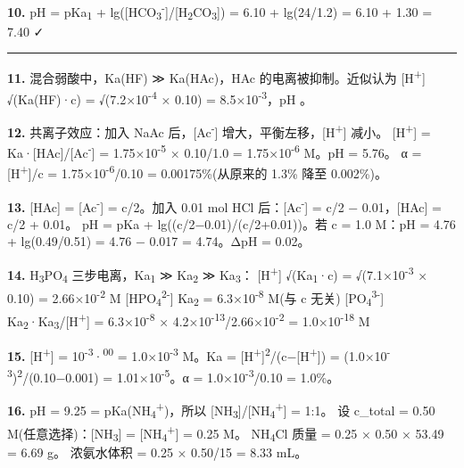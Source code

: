 \textbf{10.} pH = pKa\textsubscript{1} + lg({[}HCO\textsubscript{3}\textsuperscript{-}{]}/{[}H\textsubscript{2}CO\textsubscript{3}{]}) = 6.10 + lg(24/1.2) = 6.10 + 1.30 = 7.40 ✓

\begin{center}\rule{0.5\linewidth}{0.5pt}\end{center}

\textbf{11.} 混合弱酸中，Ka(HF) ≫ Ka(HAc)，HAc 的电离被抑制。近似认为 {[}H\textsuperscript{+}{]}  √(Ka(HF)·c) = √(7.2×10\textsuperscript{-4} × 0.10) = 8.5×10\textsuperscript{-3}，pH 。

\textbf{12.} 共离子效应：加入 NaAc 后，{[}Ac\textsuperscript{-}{]} 增大，平衡左移，{[}H\textsuperscript{+}{]} 减小。
{[}H\textsuperscript{+}{]} = Ka·{[}HAc{]}/{[}Ac\textsuperscript{-}{]} = 1.75×10\textsuperscript{-5} × 0.10/1.0 = 1.75×10\textsuperscript{-6} M。pH = 5.76。
α = {[}H\textsuperscript{+}{]}/c = 1.75×10\textsuperscript{-6}/0.10 = 0.00175\%(从原来的 1.3\% 降至 0.002\%)。

\textbf{13.} {[}HAc{]} = {[}Ac\textsuperscript{-}{]} = c/2。加入 0.01 mol HCl 后：{[}Ac\textsuperscript{-}{]} = c/2 − 0.01，{[}HAc{]} = c/2 + 0.01。
pH = pKa + lg((c/2−0.01)/(c/2+0.01))。若 c = 1.0 M：pH = 4.76 + lg(0.49/0.51) = 4.76 − 0.017 = 4.74。ΔpH = 0.02。

\textbf{14.} H\textsubscript{3}PO\textsubscript{4} 三步电离，Ka\textsubscript{1} ≫ Ka\textsubscript{2} ≫ Ka\textsubscript{3}：
{[}H\textsuperscript{+}{]}   √(Ka\textsubscript{1}·c) = √(7.1×10\textsuperscript{-3} × 0.10) = 2.66×10\textsuperscript{-2} M
{[}HPO\textsubscript{4}\textsuperscript{2-}{]}  Ka\textsubscript{2} = 6.3×10\textsuperscript{-8} M(与 c 无关)
{[}PO\textsubscript{4}\textsuperscript{3-}{]}  Ka\textsubscript{2}·Ka\textsubscript{3}/{[}H\textsuperscript{+}{]} = 6.3×10\textsuperscript{-8} × 4.2×10\textsuperscript{-13}/2.66×10\textsuperscript{-2} = 1.0×10\textsuperscript{-18} M

\textbf{15.} {[}H\textsuperscript{+}{]} = 10\textsuperscript{-3}·\textsuperscript{00} = 1.0×10\textsuperscript{-3} M。Ka = {[}H\textsuperscript{+}{]}\textsuperscript{2}/(c−{[}H\textsuperscript{+}{]}) = (1.0×10\textsuperscript{-3})\textsuperscript{2}/(0.10−0.001) = 1.01×10\textsuperscript{-5}。α = 1.0×10\textsuperscript{-3}/0.10 = 1.0\%。

\textbf{16.} pH = 9.25 = pKa(NH\textsubscript{4}\textsuperscript{+})，所以 {[}NH\textsubscript{3}{]}/{[}NH\textsubscript{4}\textsuperscript{+}{]} = 1:1。
设 c\_total = 0.50 M(任意选择)：{[}NH\textsubscript{3}{]} = {[}NH\textsubscript{4}\textsuperscript{+}{]} = 0.25 M。
NH\textsubscript{4}Cl 质量 = 0.25 × 0.50 × 53.49 = 6.69 g。
浓氨水体积 = 0.25 × 0.50/15 = 8.33 mL。


